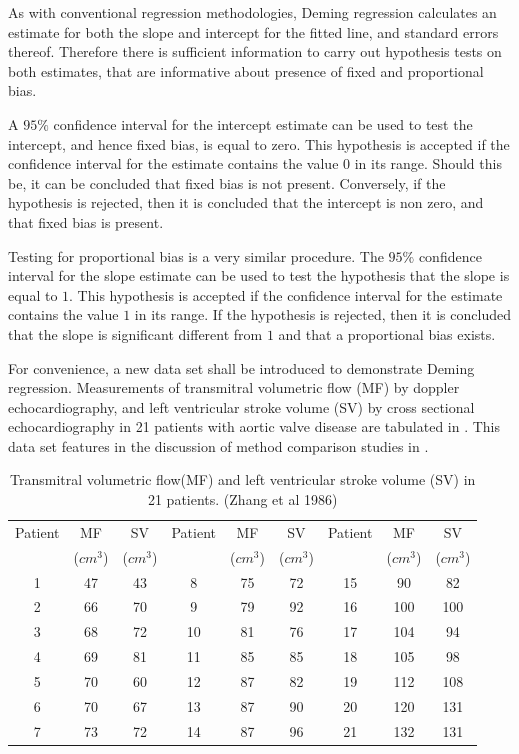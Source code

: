 \documentclass[12pt, a4paper]{report}
\theoremstyle{plain}
\theoremstyle{definition}
\theoremstyle{remark}
\begin{document}
As with conventional regression methodologies, Deming regression
calculates an estimate for both the slope and intercept for the
fitted line, and standard errors thereof. Therefore there is
sufficient information to carry out hypothesis tests on both
estimates, that are informative about presence of fixed and
proportional bias.

A $95\%$ confidence interval for the intercept estimate can be
used to test the intercept, and hence fixed bias, is equal to
zero. This hypothesis is accepted if the confidence interval for
the estimate contains the value $0$ in its range. Should this be,
it can be concluded that fixed bias is not present. Conversely, if
the hypothesis is rejected, then it is concluded that the
intercept is non zero, and that fixed bias is present.

Testing for proportional bias is a very similar procedure. The
$95\%$ confidence interval for the slope estimate can be used to
test the hypothesis that the slope is equal to $1$. This
hypothesis is accepted if the confidence interval for the estimate
contains the value $1$ in its range. If the hypothesis is
rejected, then it is concluded that the slope is significant
different from $1$ and that a proportional bias exists.

For convenience, a new data set shall be introduced to demonstrate
Deming regression. Measurements of transmitral volumetric flow
(MF) by doppler echocardiography, and left ventricular stroke
volume (SV) by cross sectional echocardiography in 21 patients
with aortic valve disease are tabulated in \citet{zhang}. This
data set features in the discussion of method comparison studies
in \citet[p.398]{AltmanBook} .


\begin{table}[h!]
	\begin{center}
		\begin{tabular}{|c|c|c||c|c|c||c|c|c|}
			\hline
			Patient & MF  & SV  & Patient & MF  & SV  & Patient & MF  & SV \\
			&($cm^{3}$)&  ($cm^{3}$) & &($cm^{3}$)&  ($cm^{3}$) & &($cm^{3}$)&  ($cm^{3}$)
			\\
			\hline
			1 & 47 & 43 &  8 & 75 & 72 &  15 & 90 & 82 \\
			2 & 66 & 70 & 9 & 79 & 92 &  16 & 100 & 100 \\
			3 & 68 & 72 & 10 & 81 & 76 & 17 & 104 & 94 \\
			4 & 69 & 81 & 11 & 85 & 85 &  18 & 105 & 98 \\
			5 & 70 & 60 & 12 & 87 & 82 & 19 & 112 & 108 \\
			6 & 70 & 67 & 13 & 87 & 90 & 20 & 120 & 131 \\
			7 & 73 & 72 & 14 & 87 & 96 &  21 & 132 & 131 \\
			
			\hline
		\end{tabular}
		\caption{Transmitral volumetric flow(MF) and left ventricular
			stroke volume (SV) in 21 patients. (Zhang et al 1986)}
	\end{center}
\end{table}
\end{document}
